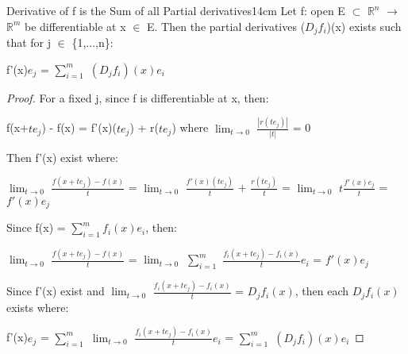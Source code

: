     \vspace{0.5cm}



    \begin{wtheorem}{Derivative of f is the Sum of all Partial derivatives}{14cm}
        Let f: open E $\subset$ $\mathbb{R}^n$ $\rightarrow$ $\mathbb{R}^m$
        be differentiable at x $\in$ E. Then the partial derivatives
        ($D_jf_i$)(x) exists such that for j $\in$ \{1,...,n\}:

        \hspace{0.5cm}
        f'(x)$e_j$ = $\sum_{i=1}^m$ $(D_jf_i)(x)e_i$
    \end{wtheorem}

    \begin{proof}
        For a fixed j, since f is differentiable at x, then:

        \hspace{0.5cm}
        f(x+$te_j$) - f(x) = f'(x)($te_j$) + r($te_j$)
        \hspace{1cm}
        where $\lim_{t \rightarrow 0}$ $\frac{|r(te_j)|}{|t|}$ = 0

        Then f'(x) exist where:

        \hspace{0.5cm}
        $\lim_{t \rightarrow 0}$ $\frac{f(x+te_j) - f(x)}{t}$
        = $\lim_{t \rightarrow 0}$ $\frac{f'(x)(te_j)}{t}$ + $\frac{r(te_j)}{t}$
        = $\lim_{t \rightarrow 0}$ $t\frac{f'(x)e_j}{t}$
        = $f'(x)e_j$

        Since f(x) = $\sum_{i=1}^m f_i(x)e_i$, then:

        \hspace{0.5cm}
        $\lim_{t \rightarrow 0}$ $\frac{f(x+te_j) - f(x)}{t}$
        = $\lim_{t \rightarrow 0}$
            $\sum_{i=1}^m$ $\frac{f_i(x+te_j) - f_i(x)}{t}e_i$
        = $f'(x)e_j$

        Since f'(x) exist and
        $\lim_{t \rightarrow 0}$ $\frac{f_i(x+te_j) - f_i(x)}{t}$ = $D_jf_i(x)$,
        then each $D_jf_i(x)$ exists where:
        
        \hspace{0.5cm}
        f'(x)$e_j$
        = $\sum_{i=1}^m$ $\lim_{t \rightarrow 0}$
            $\frac{f_i(x+te_j) - f_i(x)}{t}e_i$
        = $\sum_{i=1}^m$ $(D_jf_i)(x)e_i$
    \end{proof}

    \newpage



